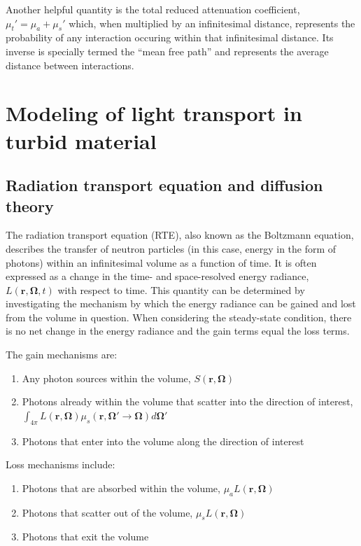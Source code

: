 Another helpful quantity is the total reduced attenuation coefficient, $\mu_t'=\mu_a + \mu_s'$ which, when multiplied by an infinitesimal distance, represents the probability of any interaction occuring within that infinitesimal distance. Its inverse is specially termed the ``mean free path'' and represents the average distance between interactions.\cite{Farrell2003}

\section{Modeling of light transport in turbid material}
\subsection{Radiation transport equation and diffusion theory}
The radiation transport equation (RTE), also known as the Boltzmann equation, describes the transfer of neutron particles (in this case, energy in the form of photons) within an infinitesimal volume as a function of time.\cite{Duderstadt1976} It is often expressed as a change in the time- and space-resolved energy radiance, $L(\mathbf{r},\mathbf{\Omega},t)$ with respect to time. This quantity can be determined by investigating the mechanism by which the energy radiance can be gained and lost from the volume in question. When considering the steady-state condition, there is no net change in the energy radiance and the gain terms equal the loss terms.

\noindent The gain mechanisms are:
\begin{enumerate}
	\item Any photon sources within the volume, $ S(\mathbf{r},\mathbf{\Omega}) $
	\item Photons already within the volume that scatter into the direction of interest,  $\int_{4\pi} L(\mathbf{r},\mathbf{\Omega}) \mu_s(\mathbf{r},\mathbf{\Omega}' \rightarrow \mathbf{\Omega}) d \mathbf{\Omega'} $
	\item Photons that enter into the volume along the direction of interest
\end{enumerate}

\noindent Loss mechanisms include:
\begin{enumerate}
	\item Photons that are absorbed within the volume, $ \mu_a L(\mathbf{r},\mathbf{\Omega}) $
	\item Photons that scatter out of the volume, $ \mu_s L(\mathbf{r},\mathbf{\Omega}) $
	\item Photons that exit the volume
\end{enumerate}

